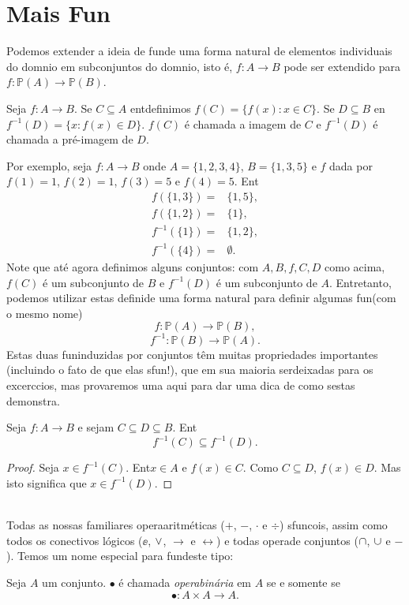 \section{Mais Fun\cois}\label{mfuncoes}

Podemos extender a ideia de fun\cao de uma forma natural de elementos individuais do dom\ih nio em subconjuntos do dom\ih nio, isto \'e, $f:A\to B$ pode ser extendido para $f:\mathbb{P}(A)\to \mathbb{P}(B)$.
\begin{definb}
Seja $f:A\to B$. Se $C\subseteq A$ ent\ao definimos $f(C)=\{f(x): x\in C\}$. Se $D\subseteq B$ en\tao $f^{-1}(D)=\{x: f(x)\in D\}$. $f(C)$ \'e chamada a imagem de $C$ e $f^{-1}(D)$ \'e chamada a pr\'e-imagem de $D$.
\end{definb}

Por exemplo, seja $f:A\to B$ onde $A=\{1,2,3,4\}$, $B=\{1,3,5\}$ e $f$ dada por $f(1)=1$, $f(2)=1$, $f(3)=5$ e $f(4)=5$. Ent\ao
\begin{equation*}
 \begin{aligned}
f(\{1,3\})=&\{1,5\},\\
f(\{1,2\})=&\{1\},\\
f^{-1}(\{1\})=&\{1,2\},\\
f^{-1}(\{4\})=&\emptyset.
 \end{aligned}
\end{equation*}
Note que at\'e agora definimos alguns conjuntos: com $A,B,f,C,D$ como acima, $f(C)$ \'e um subconjunto de $B$ e $f^{-1}(D)$ \'e um subconjunto de $A$. Entretanto, podemos utilizar estas defini\coes de uma forma natural para definir algumas fun\coes (com o mesmo nome)
\[
f:\mathbb{P}(A)\to \mathbb{P}(B),
\]
\[
f^{-1}:\mathbb{P}(B)\to \mathbb{P}(A).
\]
Estas duas fun\coes induzidas por conjuntos t\^em muitas propriedades importantes (incluindo o fato de que elas s\ao fun\cois!), que em sua maioria ser\ao deixadas para os excerc\ih cios, mas provaremos uma aqui para dar uma dica de como s\ao estas demonstra\cois.
\begin{teob}
Seja $f:A\to B$ e sejam $C\subseteq D \subseteq B$. Ent\ao
\[
f^{-1}(C)\subseteq f^{-1}(D).
\]
\end{teob}
\begin{proof}
Seja $x\in f^{-1}(C)$. Ent\ao $x\in A$ e $f(x)\in C$. Como $C\subseteq D$, $f(x)\in D$. Mas isto significa que $x\in f^{-1}(D)$.
\end{proof}
\\

Todas as nossas familiares opera\coes aritm\'eticas ($+$, $-$, $\cdot$ e $\div$) s\ao funcois, assim como todos os conectivos l\'ogicos ($\ee$, $\vee$, $\rightarrow$ e $\leftrightarrow$) e todas opera\coes de conjuntos ($\cap$, $\cup$ e $-$). Temos um nome especial para fun\coes deste tipo:
\begin{definb}
Seja $A$ um conjunto. $\bullet$ \'e chamada {\it opera\cao bin\'aria} em $A$ se e somente se 
\[
\bullet :A\times A\to A.
\]
\end{definb}

